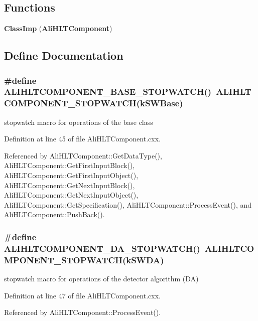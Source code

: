 \subsection*{Functions}
\begin{CompactItemize}
\item 
{\bf Class\-Imp} ({\bf Ali\-HLTComponent})
\end{CompactItemize}


\subsection{Define Documentation}
\subsubsection{\setlength{\rightskip}{0pt plus 5cm}\#define ALIHLTCOMPONENT\_\-BASE\_\-STOPWATCH()\ ALIHLTCOMPONENT\_\-STOPWATCH(k\-SWBase)}\label{AliHLTComponent_8cxx_a1}


stopwatch macro for operations of the base class 

Definition at line 45 of file Ali\-HLTComponent.cxx.

Referenced by Ali\-HLTComponent::Get\-Data\-Type(), Ali\-HLTComponent::Get\-First\-Input\-Block(), Ali\-HLTComponent::Get\-First\-Input\-Object(), Ali\-HLTComponent::Get\-Next\-Input\-Block(), Ali\-HLTComponent::Get\-Next\-Input\-Object(), Ali\-HLTComponent::Get\-Specification(), Ali\-HLTComponent::Process\-Event(), and Ali\-HLTComponent::Push\-Back().
\subsubsection{\setlength{\rightskip}{0pt plus 5cm}\#define ALIHLTCOMPONENT\_\-DA\_\-STOPWATCH()\ ALIHLTCOMPONENT\_\-STOPWATCH(k\-SWDA)}\label{AliHLTComponent_8cxx_a2}


stopwatch macro for operations of the detector algorithm (DA) 

Definition at line 47 of file Ali\-HLTComponent.cxx.

Referenced by Ali\-HLTComponent::Process\-Event().
